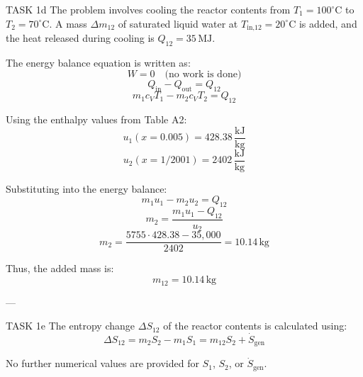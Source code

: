 TASK 1d  
The problem involves cooling the reactor contents from \( T_1 = 100^\circ\text{C} \) to \( T_2 = 70^\circ\text{C} \). A mass \( \Delta m_{12} \) of saturated liquid water at \( T_{\text{in,12}} = 20^\circ\text{C} \) is added, and the heat released during cooling is \( Q_{12} = 35 \, \text{MJ} \).  

The energy balance equation is written as:  
\[
W = 0 \quad \text{(no work is done)}
\]  
\[
Q_{\text{in}} - Q_{\text{out}} = Q_{12}
\]  
\[
m_1 c_V T_1 - m_2 c_V T_2 = Q_{12}
\]  

Using the enthalpy values from Table A2:  
\[
u_1 (x = 0.005) = 428.38 \, \frac{\text{kJ}}{\text{kg}}
\]  
\[
u_2 (x = 1 / 2001) = 2402 \, \frac{\text{kJ}}{\text{kg}}
\]  

Substituting into the energy balance:  
\[
m_1 u_1 - m_2 u_2 = Q_{12}
\]  
\[
m_2 = \frac{m_1 u_1 - Q_{12}}{u_2}
\]  
\[
m_2 = \frac{5755 \cdot 428.38 - 35,000}{2402} = 10.14 \, \text{kg}
\]  

Thus, the added mass is:  
\[
m_{12} = 10.14 \, \text{kg}
\]  

---

TASK 1e  
The entropy change \( \Delta S_{12} \) of the reactor contents is calculated using:  
\[
\Delta S_{12} = m_2 S_2 - m_1 S_1 = m_{12} S_2 + \dot{S}_{\text{gen}}
\]  

No further numerical values are provided for \( S_1 \), \( S_2 \), or \( \dot{S}_{\text{gen}} \).